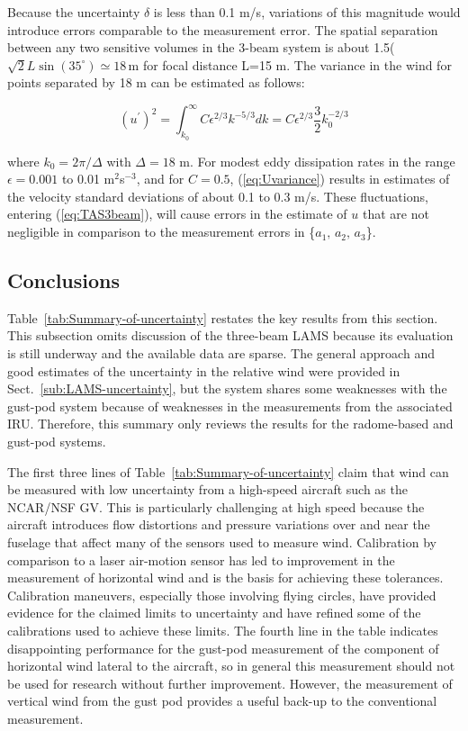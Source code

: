 \documentclass[12pt,twoside,english]{article}\usepackage[]{graphicx}\usepackage[]{color}
\let\OrgIndex\index
\renewcommand*{\index}[1]{\OrgIndex{#1}}
\begin{document}
{{Because the uncertainty $\delta$ is less than 0.1 m/s, variations of this magnitude would introduce errors comparable to the measurement error. The spatial separation between any two sensitive volumes in the 3-beam system is about 1.5($\sqrt{2}L\sin(35^{\circ})\simeq18$\,m for focal distance L=15 m. The variance in the wind for points separated by 18 m can be estimated as follows: 

\begin{equation}
(u^{\prime})^{2}=\int_{k_{0}}^{\infty}C\epsilon^{2/3}k^{-5/3}dk=C\epsilon^{2/3}\frac{3}{2}k_{0}^{-2/3}\label{eq:Uvariance} 
\end{equation}


where $k_{0}=2\pi/\Delta$ with $\Delta=18$ m. For modest eddy dissipation rates in the range $\epsilon=0.001$ to 0.01 m$^{2}$s$^{-3}$, and for $C=0.5$, (\ref{eq:Uvariance}) results in estimates of the velocity standard deviations of about 0.1 to 0.3 m/s. These fluctuations, entering (\ref{eq:TAS3beam}), will cause errors in the estimate of $u$ that are not negligible in comparison to the measurement errors in \{$a_{1},\,a_{2},\,a_{3}$\}. 


\subsection{Conclusions\label{sub:Conclusions}}

Table~\ref{tab:Summary-of-uncertainty} restates the key results from this section. 
This subsection omits discussion of the three-beam LAMS because its evaluation is still underway and the available data are sparse. The general approach and good estimates of
the uncertainty in the relative wind were provided in Sect.~\ref{sub:LAMS-uncertainty},
but the system shares some weaknesses with the gust-pod system because of weaknesses
in the measurements from the associated IRU. Therefore, this summary only reviews the
results for the radome-based and gust-pod systems.

The first three lines of Table~\ref{tab:Summary-of-uncertainty} claim that wind can be measured with low uncertainty from a high-speed aircraft such as the NCAR/NSF GV. This is particularly challenging at high speed because the aircraft introduces flow distortions and pressure variations over and near the fuselage that affect many of the sensors used to measure wind. Calibration by comparison to a laser air-motion sensor has led to improvement in the measurement of horizontal wind and is the basis for achieving these tolerances. Calibration maneuvers, especially those involving flying circles, have provided evidence for the claimed limits to uncertainty and have refined some of the calibrations used to achieve these limits. The fourth line in the table indicates disappointing performance for the gust-pod measurement of the component of horizontal wind lateral to the aircraft, so in general this measurement should not be used for research without further improvement. However, the measurement of vertical wind from the gust pod provides a useful back-up to the conventional measurement. 

}}
\end{document}
